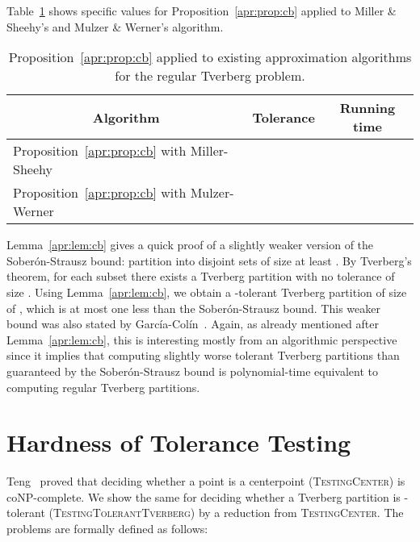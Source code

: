 \documentclass[oribibl,envcountsame,envcountsect]{llncs}
\newcommand{\Soberon}{Sober\'{o}n}
\newcommand{\GarciaColin}{Garc\'{i}a-Col\'{i}n}
\begin{document}
Table~\ref{apr:tab:conc} shows specific values for Proposition~\ref{apr:prop:cb}
applied to Miller \& Sheehy's and Mulzer \& Werner's algorithm.

\begin{table}
  \begin{center}
    \newcommand{\tableheader}[1]{\multicolumn{1}{|c|}{\textbf{#1}}}
    \renewcommand{\arraystretch}{1.5}
    \begin{tabular}{|l|c|c|}
      \hline
      \tableheader{Algorithm} &
      \tableheader{Tolerance} &
      \tableheader{Running time}
      \tabularnewline \hline \hline
      Proposition~\ref{apr:prop:cb} with Miller-Sheehy &
       &
      
      \tabularnewline \hline
      Proposition~\ref{apr:prop:cb} with Mulzer-Werner &
        &
      
      \tabularnewline \hline
    \end{tabular}
  \end{center}
  \caption{Proposition~\ref{apr:prop:cb} applied to existing approximation
    algorithms for the regular Tverberg problem.}
  \label{apr:tab:conc}
\end{table}


\begin{remark}
Lemma~\ref{apr:lem:cb} gives a quick proof of a slightly weaker version of the
\Soberon{}-Strausz bound: partition  into  disjoint sets of size at least
. By Tverberg's theorem, for each subset there exists a Tverberg
partition with no tolerance of size
. Using Lemma~\ref{apr:lem:cb},
we obtain a -tolerant Tverberg partition of size
 of , which is at most one less than the \Soberon{}-Strausz bound.
This weaker bound was also stated by \GarciaColin{}~\cite{GarciaColin2007}.
Again, as already mentioned after Lemma~\ref{apr:lem:cb}, this is
interesting mostly from an algorithmic perspective since it implies
that computing slightly worse tolerant Tverberg partitions than
guaranteed by the \Soberon{}-Strausz bound is polynomial-time
equivalent to computing regular Tverberg partitions.
\end{remark}

\section{Hardness of Tolerance Testing}\label{sec:complexity}
Teng~\cite{Teng1992} proved that deciding whether a point is a
centerpoint (\textsc{TestingCenter}) is coNP-complete. We show the same for
deciding whether a Tverberg partition is -tolerant
(\textsc{TestingTolerantTverberg}) by a reduction from \textsc{TestingCenter}.
The problems are formally defined as follows:
\end{document}
